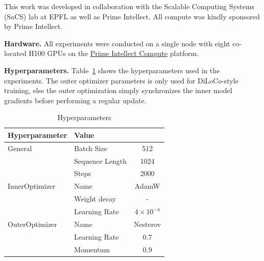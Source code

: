 \documentclass[conference, 10pt]{IEEEtran}
\begin{document}
This work was developed in collaboration with the Scalable Computing Systems
(SaCS) lab at EPFL as well as Prime Intellect. All compute was kindly sponsored
by Prime Intellect.

\newpage



\appendix

\textbf{Hardware.} All experiments were conducted on a single node with eight
co-located H100 GPUs on the \href{https://app.primeintellect.com/}{Prime
Intellect Compute} platform.

\textbf{Hyperparameters.} Table~\ref{tab:hyperparameters} shows the
hyperparameters used in the experiments. The outer optimizer parameters is only
used for DiLoCo-style training, else the outer optimization simply synchronizes
the inner model gradients before performing a regular update.

\begin{table}[ht]
\centering
\begin{tabular}{llc}
\toprule
\textbf{Hyperparameter} & \textbf{Value} \\ 
\midrule
\multirow{1}{*}{General} & Batch Size & 512 \\ 
& Sequence Length & 1024 \\ 
& Steps & 2000 \\
\hline
\multirow{1}{*}{InnerOptimizer} & Name & AdamW \\ 
& Weight decay & - \\ 
& Learning Rate & $4 \times 10^{-4}$ \\ 
\hline
\multirow{1}{*}{OuterOptimizer} & Name & Nesterov \\ 
& Learning Rate & 0.7 \\ 
& Momentum & 0.9 \\ 
\bottomrule
\end{tabular}
\caption{Hyperparameters}
\label{tab:hyperparameters}
\end{table}
\end{document}
